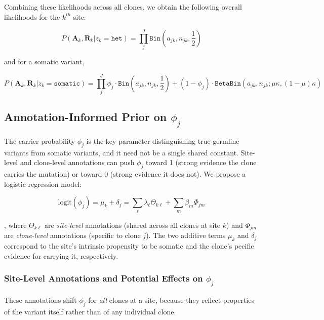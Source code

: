 \documentclass{article}
\begin{document}
Combining these likelihoods across all clones, we obtain the following overall likelihoods for the $k^{th}$ site:

\begin{equation}
P(\mathbf{A}_k, \mathbf{R}_k | z_k=\texttt{het}) = \prod_j^J  \texttt{Bin}\left(a_{jk},n_{jk},\frac{1}{2}\right)
\label{eq:full_germline_logll}
\end{equation}

and for a somatic variant,

\begin{equation}
P(\mathbf{A}_k, \mathbf{R}_k | z_k=\texttt{somatic}) = \prod_j^J  \phi_j \cdot \texttt{Bin}\left(a_{jk},n_{jk},\frac{1}{2}\right) + (1 - \phi_j)\cdot \texttt{BetaBin}(a_{jk},n_{jk}; \mu\kappa, (1-\mu)\kappa)
\label{eq:full_somatic_logll}
\end{equation}


\subsection*{Annotation-Informed Prior on $\phi_j$}

The carrier probability $\phi_j$ is the key parameter distinguishing true germline variants from somatic variants, and it need not be a single shared constant. Site-level and clone-level annotations can push $\phi_j$ toward 1 (strong
evidence the clone carries the mutation) or toward 0 (strong evidence it does not). We propose a logistic regression model:

\begin{equation}
  \mathrm{logit}(\phi_j) =  \mu_k + \delta_j =
  \sum_{\ell} \lambda_\ell \Theta_{k\ell} + \sum_{m} \beta_m \Phi_{jm}
  \label{eq:logistic}
\end{equation}

, where $\Theta_{k\ell}$ are \emph{site-level} annotations (shared across all clones at site $k$) and $\Phi_{jm}$ are \emph{clone-level} annotations (specific to clone $j$).  The two additive terms $\mu_k$ and $\delta_j$ correspond to the site's intrinsic propensity to be somatic and the clone's pecific evidence for carrying it, respectively.


\subsubsection*{Site-Level Annotations and Potential Effects on $\phi_j$}

These annotations shift $\phi_j$ for \emph{all} clones at a site, because
they reflect properties of the variant itself rather than of any individual
clone.
\end{document}
